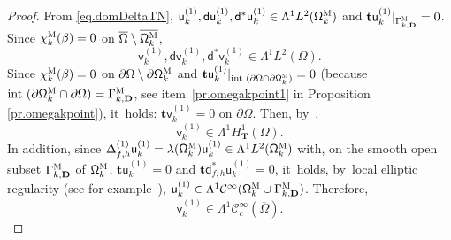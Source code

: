 \documentclass[10pt]{amsart}
\newcommand{\ft}[1]{\mathsf{#1}}
\newcommand{\mbf}[1]{\mathbf{#1}}
\let\pa\partial
\theoremstyle{plain}
\theoremstyle{definition}
\begin{document}
\begin{proof}
From \eqref{eq.domDeltaTN}, $\mathsf u_k^{(1)}, \mathsf d \mathsf u_k^{(1)}, \mathsf d^* \mathsf u_k^{(1)}\in \Lambda^1L^{2}(\mathsf \Omega^{\textsc{M}}_k)$ and $\mathbf{t}\ft u_k^{(1)}|_{\Gamma^{\textsc{M}}_{k,\mbf D}}=0$. Since $ \chi_k^{\textsc{M}} (\beta)=0$ on $\overline{\Omega}\setminus \overline{ \mathsf \Omega_k^{\textsc{M}}}$,
\[
\text{$\mathsf v_k^{(1)}, \mathsf d \mathsf v_k^{(1)}, \mathsf d^* \mathsf v_k^{(1)}\in \Lambda^1L^{2}(\Omega)$}.
\]
Since $ \chi_k^{\textsc{M}} (\beta)=0$ on $\partial {\Omega}\setminus \pa{ \mathsf \Omega_k^{\textsc{M}}}$ and $\mathbf{t}\ft u_k^{(1)}|_{\text{int } (\partial {\Omega}\cap \pa{ \mathsf \Omega_k^{\textsc{M}}})}=0$ (because $\text{int }(\pa \mathsf \Omega_k^{\textsc{M}} \cap \partial \Omega)= {\Gamma_{k,\mbf D}^{\textsc{M}}}$, see item~\eqref{pr.omegakpoint1} in Proposition \ref{pr.omegakpoint}), it~holds: $\mathbf{t}\ft v_k^{(1)}=0$ on $\partial \Omega$.
Then, by~\cite[Lem.\,73]{DLLN},
\[
\mathsf v_k^{(1)}\in \Lambda^1H^1_{\mbf T}(\Omega).
\]
In addition, since $\Delta^{(1)}_{f,h}\mathsf u_k^{(1)}= \lambda(\mathsf \Omega_k^{\textsc{M}}) \mathsf u_k^{(1)} \in \Lambda^1L^2 (\mathsf \Omega_{k}^{\textsc{M}})$ with, on the smooth open subset $\Gamma_{k,\mbf D}^{\textsc{M}}$ of $\mathsf \Omega_{k}^{\textsc{M}}$,
$\mathbf{t}\ft u_k^{(1)}=0$ and $\mathbf{t} \mathsf d_{f,h}^*\ft u_k^{(1)}=0$, it~holds, by~local elliptic regularity (see for example~\cite{ChPi}), $\mathsf u_k^{(1)}\in\Lambda^1\mathcal C^\infty (\mathsf \Omega_{k}^{\textsc{M}} \cup \Gamma_{k,\mbf D}^{\textsc{M}})$. Therefore,
\[
\mathsf v_k^{(1)}\in\Lambda^1\mathcal C^\infty_c (\overline \Omega).
\]


\end{proof}
\end{document}
